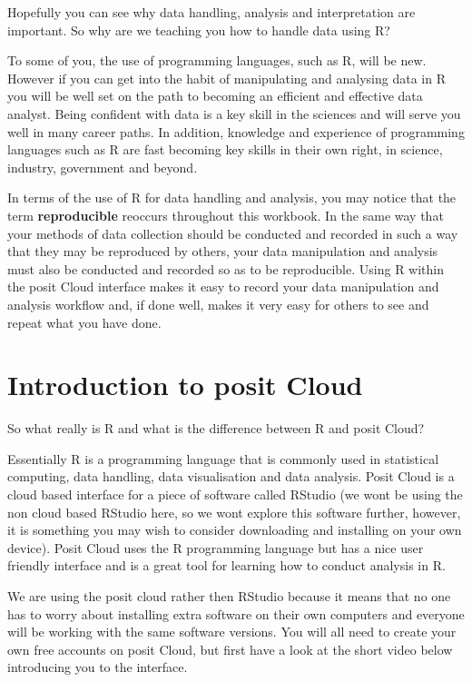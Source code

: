 \documentclass[
]{book}
\begin{document}
Hopefully you can see why data handling, analysis and interpretation are important. So why are we teaching you how to handle data using R?

To some of you, the use of programming languages, such as R, will be new. However if you can get into the habit of manipulating and analysing data in R you will be well set on the path to becoming an efficient and effective data analyst. Being confident with data is a key skill in the sciences and will serve you well in many career paths. In addition, knowledge and experience of programming languages such as R are fast becoming key skills in their own right, in science, industry, government and beyond.

In terms of the use of R for data handling and analysis, you may notice that the term \textbf{reproducible} reoccurs throughout this workbook. In the same way that your methods of data collection should be conducted and recorded in such a way that they may be reproduced by others, your data manipulation and analysis must also be conducted and recorded so as to be reproducible. Using R within the posit Cloud interface makes it easy to record your data manipulation and analysis workflow and, if done well, makes it very easy for others to see and repeat what you have done.

\hypertarget{intro-to-posit}{%
\section{Introduction to posit Cloud}\label{intro-to-posit}}

So what really is R and what is the difference between R and posit Cloud?

Essentially R is a programming language that is commonly used in statistical computing, data handling, data visualisation and data analysis. Posit Cloud is a cloud based interface for a piece of software called RStudio (we wont be using the non cloud based RStudio here, so we wont explore this software further, however, it is something you may wish to consider downloading and installing on your own device). Posit Cloud uses the R programming language but has a nice user friendly interface and is a great tool for learning how to conduct analysis in R.

We are using the posit cloud rather then RStudio because it means that no one has to worry about installing extra software on their own computers and everyone will be working with the same software versions. You will all need to create your own free accounts on posit Cloud, but first have a look at the short video below introducing you to the interface.
\end{document}
